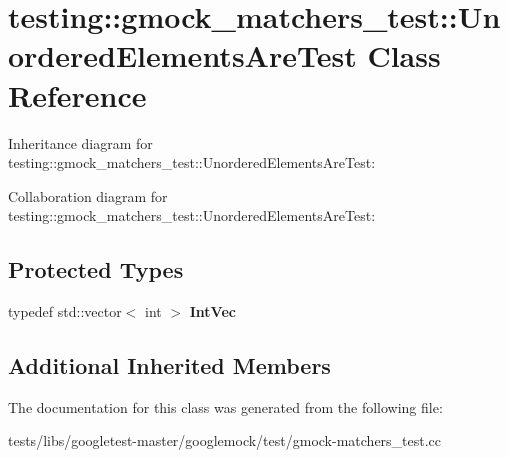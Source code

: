 \hypertarget{classtesting_1_1gmock__matchers__test_1_1UnorderedElementsAreTest}{}\section{testing\+:\+:gmock\+\_\+matchers\+\_\+test\+:\+:Unordered\+Elements\+Are\+Test Class Reference}
\label{classtesting_1_1gmock__matchers__test_1_1UnorderedElementsAreTest}


Inheritance diagram for testing\+:\+:gmock\+\_\+matchers\+\_\+test\+:\+:Unordered\+Elements\+Are\+Test\+:


Collaboration diagram for testing\+:\+:gmock\+\_\+matchers\+\_\+test\+:\+:Unordered\+Elements\+Are\+Test\+:
\subsection*{Protected Types}
\begin{DoxyCompactItemize}
\item 
\mbox{\label{classtesting_1_1gmock__matchers__test_1_1UnorderedElementsAreTest_a608750c71652943bd11fe7bb5281588d}} 
typedef std\+::vector$<$ int $>$ {\bfseries Int\+Vec}
\end{DoxyCompactItemize}
\subsection*{Additional Inherited Members}


The documentation for this class was generated from the following file\+:\begin{DoxyCompactItemize}
\item 
tests/libs/googletest-\/master/googlemock/test/gmock-\/matchers\+\_\+test.\+cc\end{DoxyCompactItemize}
